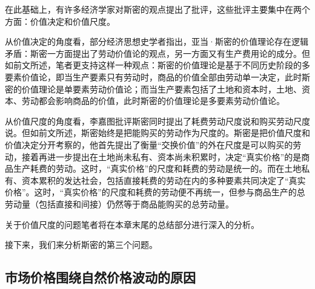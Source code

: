 在此基础上，有许多经济学家对斯密的观点提出了批评，这些批评主要集中在两个方面：价值决定和价值尺度。

从价值决定的角度看，部分经济思想史学者指出，亚当·斯密的价值理论存在逻辑矛盾：斯密一方面提出了劳动价值论的观点，另一方面又有生产费用论的成分\cite[136]{CaiJiMingCongGuDianZhengZhiJingJiXueDaoZhongGuoTeSeSheHuiZhuYiZhengZhiJingJiXueJiYuZhongGuoShiJiaoDeZhengZhiJingJiXueYanBianShangCe2023}\cite[294]{YueSeFu*XiongBiTeJingJiFenXiShiDi1Juan2017}\cite[47]{ZhongGongZhongYangMaKeSiEnGeSiLieNingSiDaLinZhuZuoBianYiJuMaKeSiEnGeSiQuanJiDi26Juan1972}。但如前文所述，笔者更支持这样一种观点：斯密的价值理论是基于不同历史阶段的多要素价值论\cite[136]{CaiJiMingCongGuDianZhengZhiJingJiXueDaoZhongGuoTeSeSheHuiZhuYiZhengZhiJingJiXueJiYuZhongGuoShiJiaoDeZhengZhiJingJiXueYanBianShangCe2023}，即当生产要素只有劳动时，商品的价值全部由劳动单一决定，此时斯密的价值理论是单要素劳动价值论；而当生产要素包括了土地和资本时，土地、资本、劳动都会影响商品的价值，此时斯密的价值理论是多要素劳动价值论\cite{peachAdamSmithsLabor2020}\cite[21]{MaKe*BuLaoGeJingJiLiLunDeHuiGu2018}\cite[70-71]{meekStudiesLaborTheory1973}。

从价值尺度的角度看，李嘉图批评斯密同时提出了耗费劳动尺度说和购买劳动尺度说\cite[7]{DaWei*LiJiaTuZhengZhiJingJiXueJiFuShuiYuanLi2021}。但如前文所述，斯密始终是把能购买的劳动作为尺度的\cite[142]{CaiJiMingCongGuDianZhengZhiJingJiXueDaoZhongGuoTeSeSheHuiZhuYiZhengZhiJingJiXueJiYuZhongGuoShiJiaoDeZhengZhiJingJiXueYanBianShangCe2023}\cite[63]{meekStudiesLaborTheory1973}。斯密是把价值尺度和价值决定分开考察的\cite[73]{ChenDaiSunCongGuDianJingJiXuePaiDaoMaKeSiRuoGanZhuYaoXueShuoFaZhanLueLun2014}，他首先提出了衡量“交换价值”的外在尺度是可以购买的劳动\cite{rodriguezherreraAdamSmithsConcept2016}，接着再进一步提出在土地尚未私有、资本尚未积累时，决定“真实价格”的是商品生产耗费的劳动。这时，“真实价格”的尺度和耗费的劳动是统一的。而在土地私有、资本累积的发达社会，包括直接耗费的劳动在内的多种要素共同决定了“真实价格”。这时，“真实价格”的尺度和耗费的劳动便不再统一，但参与商品生产的总劳动量（包括直接和间接）仍然等于商品能购买的总劳动量。\cite[67-69]{CaiJiMingLunHaoFeiDeLaoDongYuGouMaiDeLaoDongZaiJieZhiLiLunZhongDeZuoYong2022}

关于价值尺度的问题笔者将在本章末尾的总结部分进行深入的分析。

接下来，我们来分析斯密的第三个问题。

\subsection{市场价格围绕自然价格波动的原因}

